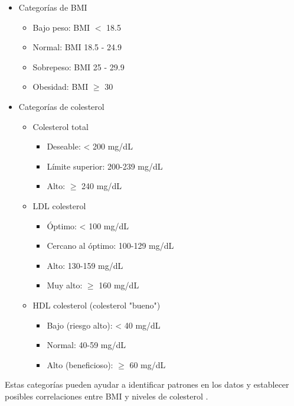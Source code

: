 \documentclass[10pt,journal,compsoc]{IEEEtran}
\begin{document}
\begin{itemize}
  \item Categorías de BMI
        \begin{itemize}
          \item Bajo peso: BMI $<$ 18.5
          \item Normal: BMI 18.5 - 24.9
          \item Sobrepeso: BMI 25 - 29.9
          \item Obesidad: BMI $\geq$ 30
        \end{itemize}
  \item Categorías de colesterol
            \begin{itemize}
              \item Colesterol total
                    \begin{itemize}
                      \item Deseable: < 200 mg/dL
                      \item Límite superior: 200-239 mg/dL
                      \item Alto: $ \geq $ 240 mg/dL
                    \end{itemize}
              \item LDL colesterol
                    \begin{itemize}
                      \item Óptimo: < 100 mg/dL
                      \item Cercano al óptimo: 100-129 mg/dL
                      \item Alto: 130-159 mg/dL
                      \item Muy alto: $ \geq $  160 mg/dL
                    \end{itemize}
              \item HDL colesterol (colesterol "bueno")
                    \begin{itemize}
                      \item Bajo (riesgo alto): < 40 mg/dL
                      \item Normal: 40-59 mg/dL
                      \item Alto (beneficioso): $ \geq $ 60 mg/dL
                    \end{itemize}
            \end{itemize}
\end{itemize}
Estas categorías pueden ayudar a identificar patrones en los datos y establecer posibles correlaciones entre BMI y niveles de colesterol \cite{aha_colesterol}\cite{cdc_bmi}\cite{nih_bmi_colesterol}.
\end{document}
